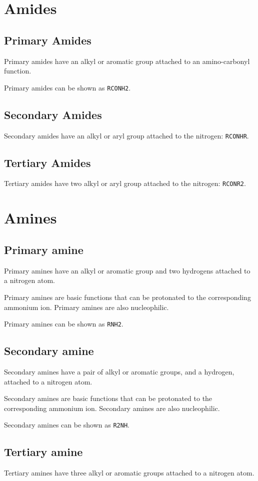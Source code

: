 \documentclass[oneside]{book} %
\theoremstyle{plain}
\begin{document}
\section{Amides}
\subsection{Primary Amides}
Primary amides have an alkyl or aromatic group attached to an amino-carbonyl
function.

Primary amides can be shown as \texttt{RCONH2}.

\subsection{Secondary Amides}
Secondary amides have an alkyl or aryl group attached to the nitrogen:
\texttt{RCONHR}.

\subsection{Tertiary Amides}
Tertiary amides have two alkyl or aryl group attached to the nitrogen:
\texttt{RCONR2}.

\section{Amines}
\subsection{Primary amine}
Primary amines have an alkyl or aromatic group and two hydrogens attached to a
nitrogen atom.

Primary amines are basic functions that can be protonated to the corresponding
ammonium ion.
Primary amines are also nucleophilic.

Primary amines can be shown as \texttt{RNH2}.

\subsection{Secondary amine}
Secondary amines have a pair of alkyl or aromatic groups, and a hydrogen,
attached to a nitrogen atom.

Secondary amines are basic functions that can be protonated to the corresponding
ammonium ion.
Secondary amines are also nucleophilic.

Secondary amines can be shown as \texttt{R2NH}.

\subsection{Tertiary amine}
Tertiary amines have three alkyl or aromatic groups attached to a nitrogen atom.
\end{document}
